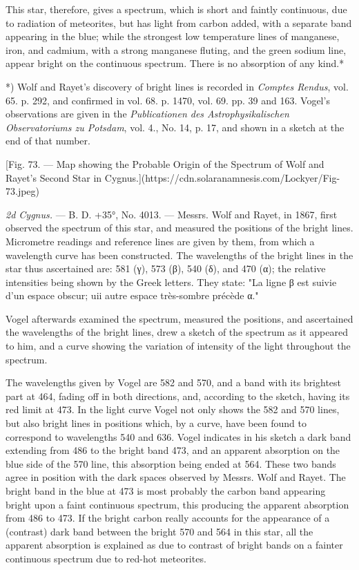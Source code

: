 \documentclass[a4paper, 12pt, oneside, polutonikogreek, english]{article}
\begin{document}
This star, therefore, gives a spectrum, which is short and faintly continuous, due to radiation of meteorites, but has light from carbon added, with a separate band appearing in the blue; while the strongest low temperature lines of manganese, iron, and cadmium, with a strong manganese fluting, and the green sodium line, appear bright on the continuous spectrum. There is no absorption of any kind.*

*) Wolf and Rayet's discovery of bright lines is recorded in \emph{Comptes Rendus}, vol. 65. p. 292, and confirmed in vol. 68. p. 1470, vol. 69. pp. 39 and 163. Vogel's observations are given in the \emph{Publicationen des Astrophysikalischen Observatoriums zu Potsdam}, vol. 4., No. 14, p. 17, and shown in a sketch at the end of that number.

[Fig. 73. --- Map showing the Probable Origin of the Spectrum of Wolf and Rayet's Second Star in Cygnus.](https://cdn.solaranamnesis.com/Lockyer/Fig-73.jpeg)

\emph{2d Cygnus.} --- B. D. +35°, No. 4013. --- Messrs. Wolf and Rayet, in 1867, first observed the spectrum of this star, and measured the positions of the bright lines. Micrometre readings and reference lines are given by them, from which a wavelength curve has been constructed. The wavelengths of the bright lines in the star thus ascertained are: 581 (γ), 573 (β), 540 (δ), and 470 (α); the relative intensities being shown by the Greek letters. They state: "La ligne β est suivie d'un espace obscur; uii autre espace très-sombre précède α."

Vogel afterwards examined the spectrum, measured the positions, and ascertained the wavelengths of the bright lines, drew a sketch of the spectrum as it appeared to him, and a curve showing the variation of intensity of the light throughout the spectrum.

The wavelengths given by Vogel are 582 and 570, and a band with its brightest part at 464, fading off in both directions, and, according to the sketch, having its red limit at 473. In the light curve Vogel not only shows the 582 and 570 lines, but also bright lines in positions which, by a curve, have been found to correspond to wavelengths 540 and 636. Vogel indicates in his sketch a dark band extending from 486 to the bright band 473, and an apparent absorption on the blue side of the 570 line, this absorption being ended at 564. These two bands agree in position with the dark spaces observed by Messrs. Wolf and Rayet. The bright band in the blue at 473 is most probably the carbon band appearing bright upon a faint continuous spectrum, this producing the apparent absorption from 486 to 473. If the bright carbon really accounts for the appearance of a (contrast) dark band between the bright 570 and 564 in this star, all the apparent absorption is explained as due to contrast of bright bands on a fainter continuous spectrum due to red-hot meteorites.
\end{document}
